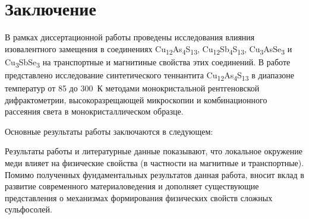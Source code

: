 \chapter*{Заключение}						%



В рамках диссертационной работы проведены исследования влияния изовалентного замещения в соединениях Cu\textsubscript{12}As\textsubscript{4}S\textsubscript{13}, Cu\textsubscript{12}Sb\textsubscript{4}S\textsubscript{13}, Cu\textsubscript{3}AsSe\textsubscript{3} и Cu\textsubscript{3}SbSe\textsubscript{3} на транспортные и магнитиные свойства этих соединений. 
В работе представлено исследование  синтетического теннантита Cu\textsubscript{12}As\textsubscript{4}S\textsubscript{13} в диапазоне температур от 85 до 300~К методами монокристальной рентгеновской дифрактометрии, высокоразрещающей микроскопии и комбинационного рассеяния света в монокристаллическом образце.

Основные результаты работы заключаются в следующем:


Результаты работы и литературные данные показывают, что локальное окружение меди влияет на физические свойства (в частности на магнитные и транспортные). Помимо полученных фундаментальных результатов данная работа, вносит вклад в развитие современного материаловедения и дополняет существующие представления о механизмах формирования физических свойств сложных сульфосолей.



